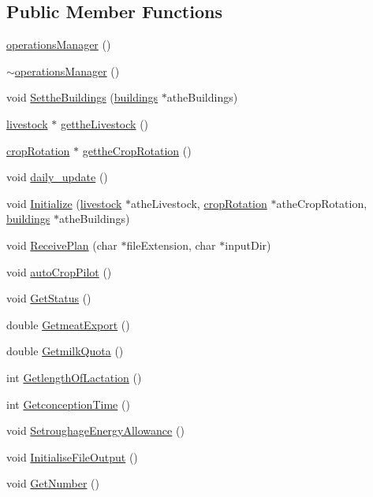 \subsection*{Public Member Functions}
\begin{DoxyCompactItemize}
\item 
\hyperlink{classoperations_manager_aed9d480402e7e7643e96e08563c2490d}{operationsManager} ()
\item 
\hyperlink{classoperations_manager_a9aae04376cecc0fa7a13cadcde8cb2b5}{$\sim$operationsManager} ()
\item 
void \hyperlink{classoperations_manager_a882e3c3a3da0b153bc380a6e5d2a80c4}{SettheBuildings} (\hyperlink{classbuildings}{buildings} $\ast$atheBuildings)
\item 
\hyperlink{classlivestock}{livestock} $\ast$ \hyperlink{classoperations_manager_a43799d6fb845ba2a7936b7640eb81b55}{gettheLivestock} ()
\item 
\hyperlink{classcrop_rotation}{cropRotation} $\ast$ \hyperlink{classoperations_manager_a4686ccc4794cd478cdac45773c2432ef}{gettheCropRotation} ()
\item 
void \hyperlink{classoperations_manager_a028a7ab1978e41ea742d248b2fce3835}{daily\_\-update} ()
\item 
void \hyperlink{classoperations_manager_a626da45cf40c334217d05a5e170c5e80}{Initialize} (\hyperlink{classlivestock}{livestock} $\ast$atheLivestock, \hyperlink{classcrop_rotation}{cropRotation} $\ast$atheCropRotation, \hyperlink{classbuildings}{buildings} $\ast$atheBuildings)
\item 
void \hyperlink{classoperations_manager_ae0ed0a06687b22465717078dc79a087d}{ReceivePlan} (char $\ast$fileExtension, char $\ast$inputDir)
\item 
void \hyperlink{classoperations_manager_a82f5de5d5b758b49958440abb7e37312}{autoCropPilot} ()
\item 
void \hyperlink{classoperations_manager_a265048a0a8b280daa0719681d1dfce85}{GetStatus} ()
\item 
double \hyperlink{classoperations_manager_a1a495e27eb668f3e313119ec70514297}{GetmeatExport} ()
\item 
double \hyperlink{classoperations_manager_ad26098a15515e3074689104adcf06511}{GetmilkQuota} ()
\item 
int \hyperlink{classoperations_manager_ae313974b71c982f6b4ae24e96f6274e2}{GetlengthOfLactation} ()
\item 
int \hyperlink{classoperations_manager_abbf6d4466cfb097146e1957fdbf0b629}{GetconceptionTime} ()
\item 
void \hyperlink{classoperations_manager_a324640de5c140025dbc909addb55d367}{SetroughageEnergyAllowance} ()
\item 
void \hyperlink{classoperations_manager_aa2f597f6e05fbf5f2e5d113d6ad32e6d}{InitialiseFileOutput} ()
\item 
void \hyperlink{classoperations_manager_a8d812250ac0d1d99a56ef15949d276fd}{GetNumber} ()
\end{DoxyCompactItemize}


